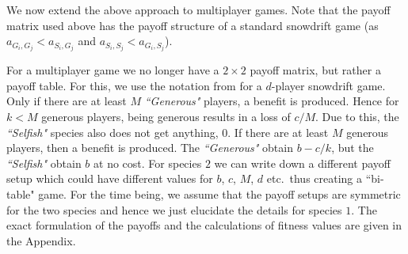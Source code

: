\documentclass[a4paper]{scrartcl}
\begin{document}
We now extend the above approach to multiplayer games.
Note that the payoff matrix used above has the payoff structure of a standard snowdrift game (as $a_{G_i,G_j} < a_{S_i,G_j}$ and $a_{S_i,S_j} < a_{G_i,S_j}$).

For a multiplayer game we no longer have a $2 \times 2$ payoff matrix, but rather a payoff table. For this, we use the notation from
\citep{souza:2009aa} for a $d$-player snowdrift game.
Only if there are at least $M$ \textit{``Generous"} players, a benefit is produced.
Hence for $k<M$ generous players, being generous results in a loss of $c/M$.
Due to this, the \textit{``Selfish"} species also does not get anything, $0$.
If there are at least $M$ generous players, then a benefit is produced. The \textit{``Generous"} obtain $b - c/k$, but the \textit{``Selfish"} obtain $b$ at no cost.
For species $2$ we can write down a different payoff setup which could have different values for $b$, $c$, $M$, $d$ etc.\ thus creating a ``bi-table" game.
For the time being, we assume that the payoff setups are symmetric for the two species and hence we just elucidate the details for species $1$.
The exact formulation of the payoffs and the calculations of fitness values are given in the Appendix.
\end{document}

